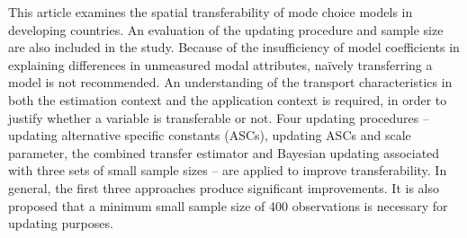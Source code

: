 This article examines the spatial transferability of mode choice models in developing countries. An evaluation of the updating procedure and sample size are also included in the study. Because of the insufficiency of model coefficients in explaining differences in unmeasured modal attributes, naïvely transferring a model is not recommended. An understanding of the transport characteristics in both the estimation context and the application context is required, in order to justify whether a variable is transferable or not. Four updating procedures – updating alternative specific constants (ASCs), updating ASCs and scale parameter, the combined transfer estimator and Bayesian updating associated with three sets of small sample sizes – are applied to improve transferability. In general, the first three approaches produce significant improvements. It is also proposed that a minimum small sample size of 400 observations is necessary for updating purposes.
